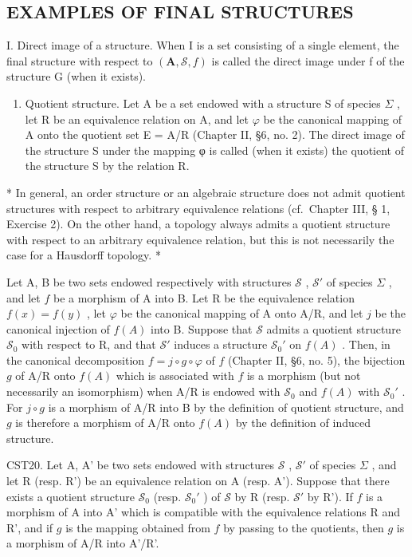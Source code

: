 \subsection{EXAMPLES OF FINAL STRUCTURES}

I. Direct image of a structure. When I is a set consisting of a single element, the final structure with respect to \((\mathbf{A}, \mathcal{S}, f)\) is called the direct image under f of the structure G (when it exists).

\begin{enumerate}
\def\labelenumi{\Roman{enumi}.}
\setcounter{enumi}{1}
\tightlist
\item
  Quotient structure. Let A be a set endowed with a structure S of species \(\Sigma\) , let R be an equivalence relation on A, and let \(\varphi\) be the canonical mapping of A onto the quotient set E = A/R (Chapter II, §6, no. 2). The direct image of the structure S under the mapping φ is called (when it exists) the quotient of the structure S by the relation R.
\end{enumerate}

* In general, an order structure or an algebraic structure does not admit quotient structures with respect to arbitrary equivalence relations (cf.~Chapter III, § 1, Exercise 2). On the other hand, a topology always admits a quotient structure with respect to an arbitrary equivalence relation, but this is not necessarily the case for a Hausdorff topology. *

Let A, B be two sets endowed respectively with structures \(\mathcal{S}\) , \(\mathcal{S}'\) of species \(\Sigma\) , and let \(f\) be a morphism of A into B. Let R be the equivalence relation \(f(x) = f(y)\) , let \(\varphi\) be the canonical mapping of A onto A/R, and let \(j\) be the canonical injection of \(f(A)\) into B. Suppose that \(\mathcal{S}\) admits a quotient structure \(\mathcal{S}_0\) with respect to R, and that \(\mathcal{S}'\) induces a structure \(\mathcal{S}_0'\) on \(f(A)\) . Then, in the canonical decomposition \(f = j \circ g \circ \varphi\) of \(f\) (Chapter II, §6, no. 5), the bijection \(g\) of A/R onto \(f(A)\) which is associated with \(f\) is a morphism (but not necessarily an isomorphism) when A/R is endowed with \(\mathcal{S}_0\) and \(f(A)\) with \(\mathcal{S}_0'\) . For \(j \circ g\) is a morphism of A/R into B by the definition of quotient structure, and \(g\) is therefore a morphism of A/R onto \(f(A)\) by the definition of induced structure.

CST20. Let A, A' be two sets endowed with structures \(\mathcal{S}\) , \(\mathcal{S}'\) of species \(\Sigma\) , and let R (resp. R') be an equivalence relation on A (resp. A'). Suppose that there exists a quotient structure \(\mathcal{S}_0\) (resp. \(\mathcal{S}_0'\) ) of \(\mathcal{S}\) by R (resp. \(\mathcal{S}'\) by R'). If \(f\) is a morphism of A into A' which is compatible with the equivalence relations R and R', and if \(g\) is the mapping obtained from \(f\) by passing to the quotients, then \(g\) is a morphism of A/R into A'/R'.

